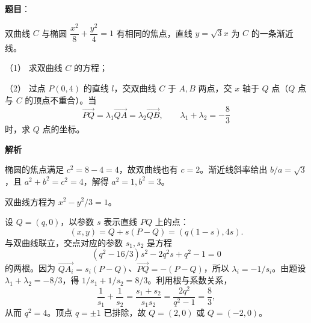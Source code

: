 \begin{answer}

\textbf{题目}：

双曲线 $C$ 与椭圆 $\dfrac{x^2}{8}+\dfrac{y^2}{4}=1$ 有相同的焦点，直线 $y=\sqrt3x$ 为 $C$ 的一条渐近线。

（1） 求双曲线 $C$ 的方程；

（2） 过点 $P(0,4)$ 的直线 $l$，交双曲线 $C$ 于 $A,B$ 两点，交 $x$ 轴于 $Q$ 点（$Q$ 点与 $C$ 的顶点不重合）。当
\nopagebreak[4]
\[
\overrightarrow{PQ}=\lambda_1\overrightarrow{QA}=\lambda_2\overrightarrow{QB},\qquad
\lambda_1+\lambda_2=-\dfrac83
\]
时，求 $Q$ 点的坐标。

\textbf{解析}

椭圆的焦点满足 $c^2=8-4=4$，故双曲线也有 $c=2$。渐近线斜率给出 $b/a=\sqrt3$，且 $a^2+b^2=c^2=4$，解得 $a^2=1,b^2=3$。


双曲线方程为 $x^2-y^2/3=1$。


设 $Q=(q,0)$，以参数 $s$ 表示直线 $PQ$ 上的点：
\nopagebreak[4]
\[
(x,y)=Q+s(P-Q)=(q(1-s),4s).
\]
与双曲线联立，交点对应的参数 $s_1,s_2$ 是方程
\nopagebreak[4]
\[
(q^2-16/3)s^2-2q^2s+q^2-1=0
\]
的两根。因为 $\overrightarrow{QA_i}=s_i(P-Q)$、$\overrightarrow{PQ}=-(P-Q)$，所以 $\lambda_i=-1/s_i$。由题设 $\lambda_1+\lambda_2=-8/3$，得 $1/s_1+1/s_2=8/3$。利用根与系数关系，
\nopagebreak[4]
\[
\frac1{s_1}+\frac1{s_2}=\frac{s_1+s_2}{s_1s_2}=\frac{2q^2}{q^2-1}=\frac83,
\]
从而 $q^2=4$。顶点 $q=\pm1$ 已排除，故 $Q=(2,0)$ 或 $Q=(-2,0)$。



\end{answer}
